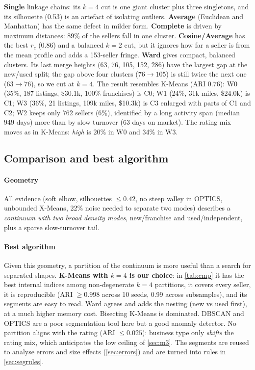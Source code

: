 \textbf{Single} linkage chains: its $k=4$ cut is one giant cluster plus three singletons, and its silhouette (0.53) is an artefact of isolating outliers. \textbf{Average} (Euclidean and Manhattan) has the same defect in milder form. \textbf{Complete} is driven by maximum distances: 89\% of the sellers fall in one cluster. \textbf{Cosine/Average} has the best $r_c$ (0.86) and a balanced $k=2$ cut, but it ignores how far a seller is from the mean profile and adds a 153-seller fringe. \textbf{Ward} gives compact, balanced clusters. Its last merge heights (63, 76, 105, 152, 286) have the largest gap at the new/used split; the gap above four clusters ($76\to105$) is still twice the next one ($63\to76$), so we cut at $k=4$. The result resembles K-Means (ARI 0.76): W0 (35\%, 187 listings, \$30.1k, 100\% franchises) is C0; W1 (24\%, 31k miles, \$24.0k) is C1; W3 (36\%, 21 listings, 109k miles, \$10.3k) is C3 enlarged with parts of C1 and C2; W2 keeps only 762 sellers (6\%), identified by a long activity span (median 949 days) more than by slow turnover (63 days on market). The rating mix moves as in K-Means: \emph{high} is 20\% in W0 and 34\% in W3.

\subsection{Comparison and best algorithm}
\begin{table}[t]
\centering
\caption{Final comparison. For DBSCAN, internal and external indices refer to non-noise points only, hence optimistic; SSE is comparable only at equal $k$. ARI$_\mathrm{KM4}$: agreement with the chosen K-Means partition.}\label{tab:cmp}
\end{table}

\paragraph{Geometry} All evidence (soft elbow, silhouettes $\leq0.42$, no steep valley in OPTICS, unbounded X-Means, 22\% noise needed to separate two modes) describes a \emph{continuum with two broad density modes}, new/franchise and used/independent, plus a sparse slow-turnover tail.

\paragraph{Best algorithm} Given this geometry, a partition of the continuum is more useful than a search for separated shapes. \textbf{K-Means with $k=4$ is our choice}: in \cref{tab:cmp} it has the best internal indices among non-degenerate $k=4$ partitions, it covers every seller, it is reproducible (ARI $\geq0.998$ across 10 seeds, 0.99 across subsamples), and its segments are easy to read. Ward agrees and adds the nesting (new vs used first), at a much higher memory cost. Bisecting K-Means is dominated. DBSCAN and OPTICS are a poor segmentation tool here but a good anomaly detector. No partition aligns with the rating (ARI $\leq0.025$): business type only \emph{shifts} the rating mix, which anticipates the low ceiling of \cref{sec:m3}. The segments are reused to analyse errors and size effects (\cref{sec:errors}) and are turned into rules in \cref{sec:segrules}.
